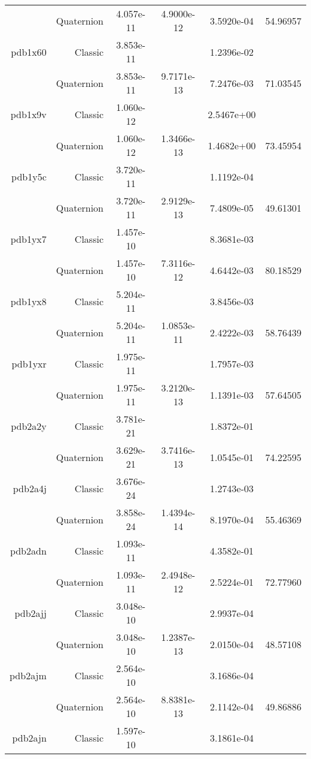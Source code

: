 \begin{xltabular}{\textwidth}{r|rS[table-format=1.3e+2]S[table-format=1.4e+2]S[table-format=1.4e+2]S[table-format=-1.5]}
& Quaternion & 4.057e-11 & 4.9000e-12 & 3.5920e-04 & 54.96957\\  \addlinespace
pdb1x60 & Classic & 3.853e-11 &  & 1.2396e-02 & \\
& Quaternion & 3.853e-11 & 9.7171e-13 & 7.2476e-03 & 71.03545\\  \addlinespace
pdb1x9v & Classic & 1.060e-12 &  & 2.5467e+00 & \\
& Quaternion & 1.060e-12 & 1.3466e-13 & 1.4682e+00 & 73.45954\\  \addlinespace
pdb1y5c & Classic & 3.720e-11 &  & 1.1192e-04 & \\
& Quaternion & 3.720e-11 & 2.9129e-13 & 7.4809e-05 & 49.61301\\  \addlinespace
pdb1yx7 & Classic & 1.457e-10 &  & 8.3681e-03 & \\
& Quaternion & 1.457e-10 & 7.3116e-12 & 4.6442e-03 & 80.18529\\  \addlinespace
pdb1yx8 & Classic & 5.204e-11 &  & 3.8456e-03 & \\
& Quaternion & 5.204e-11 & 1.0853e-11 & 2.4222e-03 & 58.76439\\  \addlinespace
pdb1yxr & Classic & 1.975e-11 &  & 1.7957e-03 & \\
& Quaternion & 1.975e-11 & 3.2120e-13 & 1.1391e-03 & 57.64505\\  \addlinespace
pdb2a2y & Classic & 3.781e-21 &  & 1.8372e-01 & \\
& Quaternion & 3.629e-21 & 3.7416e-13 & 1.0545e-01 & 74.22595\\  \addlinespace
pdb2a4j & Classic & 3.676e-24 &  & 1.2743e-03 & \\
& Quaternion & 3.858e-24 & 1.4394e-14 & 8.1970e-04 & 55.46369\\  \addlinespace
pdb2adn & Classic & 1.093e-11 &  & 4.3582e-01 & \\
& Quaternion & 1.093e-11 & 2.4948e-12 & 2.5224e-01 & 72.77960\\  \addlinespace
pdb2ajj & Classic & 3.048e-10 &  & 2.9937e-04 & \\
& Quaternion & 3.048e-10 & 1.2387e-13 & 2.0150e-04 & 48.57108\\  \addlinespace
pdb2ajm & Classic & 2.564e-10 &  & 3.1686e-04 & \\
& Quaternion & 2.564e-10 & 8.8381e-13 & 2.1142e-04 & 49.86886\\  \addlinespace
pdb2ajn & Classic & 1.597e-10 &  & 3.1861e-04 & \\

\end{xltabular}
